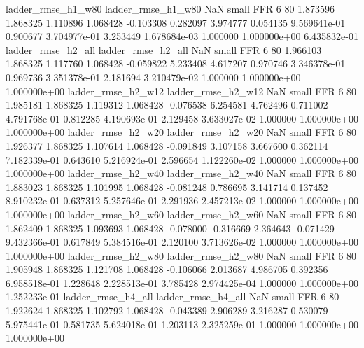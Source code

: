       ladder_rmse_h1_w80       ladder_rmse_h1_w80                   NaN      small      FFR                 6 80 1.873596       1.868325 1.110896       1.068428   -0.103308      0.282097      3.974777     0.054135   9.569641e-01  0.900677 3.704977e-01     3.253449   1.678684e-03            1.000000    1.000000e+00        6.435832e-01
      ladder_rmse_h2_all       ladder_rmse_h2_all                   NaN      small      FFR                 6 80 1.966103       1.868325 1.117760       1.068428   -0.059822      5.233408      4.617207     0.970746   3.346378e-01  0.969736 3.351378e-01     2.181694   3.210479e-02            1.000000    1.000000e+00        1.000000e+00
      ladder_rmse_h2_w12       ladder_rmse_h2_w12                   NaN      small      FFR                 6 80 1.985181       1.868325 1.119312       1.068428   -0.076538      6.254581      4.762496     0.711002   4.791768e-01  0.812285 4.190693e-01     2.129458   3.633027e-02            1.000000    1.000000e+00        1.000000e+00
      ladder_rmse_h2_w20       ladder_rmse_h2_w20                   NaN      small      FFR                 6 80 1.926377       1.868325 1.107614       1.068428   -0.091849      3.107158      3.667600     0.362114   7.182339e-01  0.643610 5.216924e-01     2.596654   1.122260e-02            1.000000    1.000000e+00        1.000000e+00
      ladder_rmse_h2_w40       ladder_rmse_h2_w40                   NaN      small      FFR                 6 80 1.883023       1.868325 1.101995       1.068428   -0.081248      0.786695      3.141714     0.137452   8.910232e-01  0.637312 5.257646e-01     2.291936   2.457213e-02            1.000000    1.000000e+00        1.000000e+00
      ladder_rmse_h2_w60       ladder_rmse_h2_w60                   NaN      small      FFR                 6 80 1.862409       1.868325 1.093693       1.068428   -0.078000     -0.316669      2.364643    -0.071429   9.432366e-01  0.617849 5.384516e-01     2.120100   3.713626e-02            1.000000    1.000000e+00        1.000000e+00
      ladder_rmse_h2_w80       ladder_rmse_h2_w80                   NaN      small      FFR                 6 80 1.905948       1.868325 1.121708       1.068428   -0.106066      2.013687      4.986705     0.392356   6.958518e-01  1.228648 2.228513e-01     3.785428   2.974425e-04            1.000000    1.000000e+00        1.252233e-01
      ladder_rmse_h4_all       ladder_rmse_h4_all                   NaN      small      FFR                 6 80 1.922624       1.868325 1.102792       1.068428   -0.043389      2.906289      3.216287     0.530079   5.975441e-01  0.581735 5.624018e-01     1.203113   2.325259e-01            1.000000    1.000000e+00        1.000000e+00
